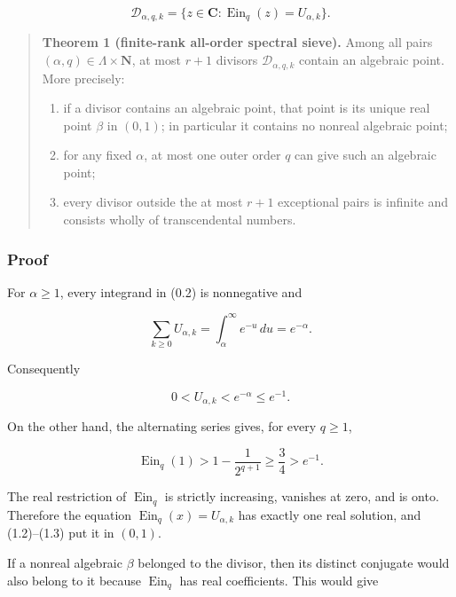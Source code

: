\documentclass[11pt]{article}
\theoremstyle{keio}
\theoremstyle{definition}
\theoremstyle{remark}
\providecommand{\tightlist}{\setlength{\itemsep}{0pt}\setlength{\parskip}{0pt}}
\begin{document}
\[
 \mathcal D_{\alpha,q,k}
 =\{z\in\mathbf C:
 \operatorname{Ein}_q(z)=U_{\alpha,k}\}.                      \tag{GS-1.1}
\]

\begin{quote}
\textbf{Theorem 1 (finite-rank all-order spectral sieve).} Among all pairs
\((\alpha,q)\in\Lambda\times\mathbf N\), at most \(r+1\) divisors
\(\mathcal D_{\alpha,q,k}\) contain an algebraic point. More precisely:

\begin{enumerate}
\def\labelenumi{\arabic{enumi}.}
\tightlist
\item
  if a divisor contains an algebraic point, that point is its unique real
  point \(\beta\) in \((0,1)\); in particular it contains no nonreal
  algebraic point;
\item
  for any fixed \(\alpha\), at most one outer order \(q\) can give such an
  algebraic point;
\item
  every divisor outside the at most \(r+1\) exceptional pairs is infinite
  and consists wholly of transcendental numbers.
\end{enumerate}
\end{quote}

\subsubsection{Proof}

For \(\alpha\geq1\), every integrand in (0.2) is nonnegative and

\[
 \sum_{k\geq0}U_{\alpha,k}
 =\int_\alpha^\infty e^{-u}\,du=e^{-\alpha}.
\]

Consequently

\[
 0<U_{\alpha,k}<e^{-\alpha}\leq e^{-1}.                       \tag{GS-1.2}
\]

On the other hand, the alternating series gives, for every \(q\geq1\),

\[
 \operatorname{Ein}_q(1)
 >1-\frac1{2^{q+1}}\geq\frac34>e^{-1}.                        \tag{GS-1.3}
\]

The real restriction of \(\operatorname{Ein}_q\) is strictly increasing,
vanishes at zero, and is onto. Therefore the equation
\(\operatorname{Ein}_q(x)=U_{\alpha,k}\) has exactly one real solution,
and (1.2)--(1.3) put it in \((0,1)\).

If a nonreal algebraic \(\beta\) belonged to the divisor, then its distinct
conjugate would also belong to it because \(\operatorname{Ein}_q\) has real
coefficients. This would give
\end{document}
